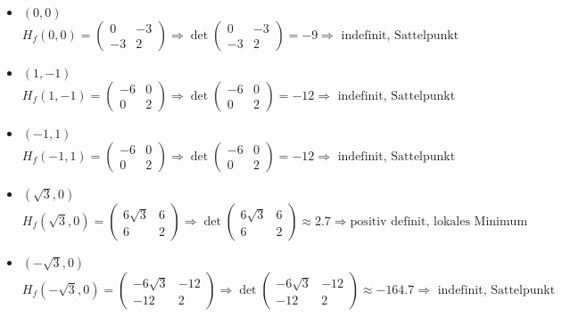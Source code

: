 \documentclass[10pt,a4paper,parskip=half]{scrartcl}
\begin{document}
	\begin{itemize}
		\item 	$(0,0)$
			\[H_f(0,0) = 
			\begin{pmatrix}
				0 & -3 \\
				-3 & 2		
			\end{pmatrix} \Rightarrow 
			\det \begin{pmatrix}
				0 & -3 \\
				-3 & 2		
			\end{pmatrix} = -9 \Rightarrow \text{ indefinit, Sattelpunkt}\]
		\item 	$(1,-1)$
			\[H_f(1,-1) = 
			\begin{pmatrix}
				-6 & 0 \\
				0 & 2		
			\end{pmatrix} \Rightarrow 
			\det \begin{pmatrix}
				-6 & 0 \\
				0 & 2		
			\end{pmatrix} = -12 \Rightarrow \text{ indefinit, Sattelpunkt}\]
		\item  	$(-1,1)$
			\[H_f(-1,1) = 
			\begin{pmatrix}
				-6 & 0 \\
				0 & 2		
			\end{pmatrix} \Rightarrow 
			\det \begin{pmatrix}
				-6 & 0 \\
				0 & 2		
			\end{pmatrix} = -12 \Rightarrow \text{ indefinit, Sattelpunkt}\]
		\item 	$(\sqrt{3},0)$
			\[H_f(\sqrt{3},0) = 
			\begin{pmatrix}
				6\sqrt{3} & 6 \\
				6 & 2		
			\end{pmatrix} \Rightarrow 
			\det \begin{pmatrix}
				6\sqrt{3} & 6 \\
				6 & 2	
			\end{pmatrix} \approx 2.7 \Rightarrow \text{positiv definit, lokales Minimum}\]
		\item  	$(-\sqrt{3},0)$
			\[H_f(-\sqrt{3},0) = 
			\begin{pmatrix}
				-6\sqrt{3} & -12 \\
				-12 & 2		
			\end{pmatrix} \Rightarrow 
			\det \begin{pmatrix}
				-6\sqrt{3} & -12 \\
				-12 & 2	
			\end{pmatrix} \approx -164.7 \Rightarrow \text{ indefinit, Sattelpunkt}\]
	\end{itemize}	
\end{document}
